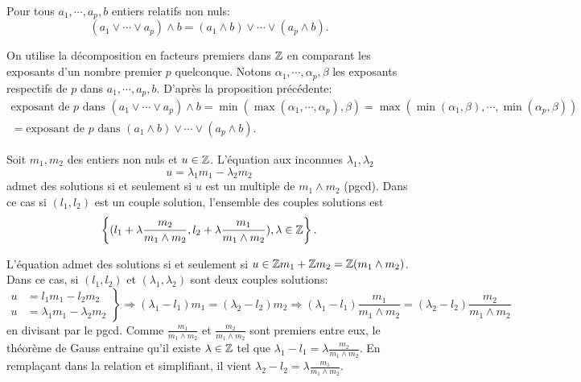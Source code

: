 \begin{propn}
  Pour tous $a_1, \cdots ,a_p, b$ entiers relatifs non nuls:
  \begin{displaymath}
    \left(a_1 \vee \cdots \vee a_p\right)\wedge b = (a_1 \wedge b) \vee \cdots \vee (a_p \wedge b).
  \end{displaymath}
\end{propn}
\begin{demo}
  On utilise la décomposition en facteurs premiers dans $\mathbb{Z}$ en comparant les exposants d'un nombre premier $p$ quelconque. Notons $\alpha_1, \cdots, \alpha_p, \beta$ les exposants respectifs de $p$ dans $a_1, \cdots, a_p, b$. D'après la proposition précédente:
  \begin{align*}
    \text{exposant de $p$ dans } \left(a_1 \vee \cdots \vee a_p\right)\wedge b 
    = \min \left( \max(\alpha_1, \cdots, \alpha_p) , \beta \right) 
    = \max\left( \min(\alpha_1, \beta), \cdots , \min(\alpha_p,\beta)\right) \\
    = \text{exposant de $p$ dans } (a_1 \wedge b) \vee \cdots \vee (a_p \wedge b).
  \end{align*}
\end{demo}

\begin{propn}
  Soit $m_1, m_2$ des entiers non nuls et $u\in \mathbb{Z}$. L'équation aux inconnues $\lambda_1, \lambda_2$
  \begin{displaymath}
    u = \lambda_1 m_1 - \lambda_2 m_2
  \end{displaymath}
  admet des solutions si et seulement si $u$ est un multiple de $m_1 \wedge m_2$ (pgcd). Dans ce cas si $(l_1, l_2)$ est un couple solution, l'ensemble des couples solutions est
  \begin{displaymath}
    \left \lbrace (l_1 + \lambda \frac{m_2}{m_1 \wedge m_2},l_2 + \lambda \frac{m_1}{m_1 \wedge m_2}), \lambda \in \mathbb{Z} \right\rbrace .
  \end{displaymath}
\end{propn}
\begin{demo}
  L'équation admet des solutions si et seulement si $u \in \mathbb{Z} m_1 + \mathbb{Z} m_2 = \mathbb{Z} (m_1\wedge m_2)$. Dans ce cas, si $(l_1,l_2)$ et $(\lambda_1, \lambda_2)$ sont deux couples solutions:
  \begin{displaymath}
    \left. 
    \begin{aligned}
      u &= l_1 m_1 - l_2 m_2 \\
      u &= \lambda_1 m_1 - \lambda_2 m_2
    \end{aligned}
    \right\rbrace \Rightarrow (\lambda_1 - l_1)m_1 = (\lambda_2 - l_2)m_2 \Rightarrow (\lambda_1 - l_1)\frac{m_1}{m_1 \wedge m_2} = (\lambda_2 - l_2)\frac{m_2}{m_1 \wedge m_2}
  \end{displaymath}
en divisant par le pgcd. Comme $\frac{m_1}{m_1 \wedge m_2}$ et $\frac{m_2}{m_1 \wedge m_2}$ sont premiers entre eux, le théorème de Gauss entraine qu'il existe $\lambda \in \mathbb{Z}$ tel que $\lambda_1 - l_1 = \lambda \frac{m_2}{m_1 \wedge m_2}$. En remplaçant dans la relation et simplifiant, il vient $\lambda_2 - l_2 = \lambda \frac{m_1}{m_1 \wedge m_2}$.
\end{demo}

